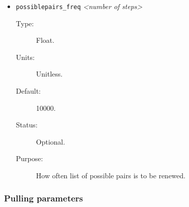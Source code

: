 \documentclass[a4paper]{article}
\begin{document}
\begin{itemize}
\item \texttt{possiblepairs\_freq} \textit{\textless number of steps\textgreater}
\begin{description}
\item[Type:] Float.
\item[Units:] Unitless.
\item[Default:] 10000.
\item[Status:] Optional.
\item[Purpose:] How often list of possible pairs is to be renewed.
\end{description}

\end{itemize}

   
\subsubsection{Pulling parameters}
\label{sec:par.pulling}
\end{document}
